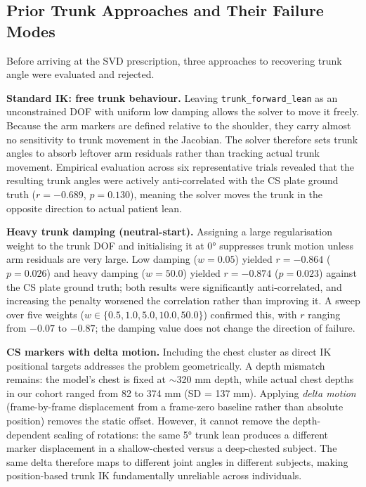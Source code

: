 \documentclass[12pt, a4paper]{elsarticle}
\begin{document}
\subsection{Prior Trunk Approaches and Their Failure Modes}
\label{sec:prior_trunk}
Before arriving at the SVD prescription, three approaches to recovering trunk angle were evaluated and rejected.

\textbf{Standard IK: free trunk behaviour.} Leaving \texttt{trunk\_forward\_lean} as an unconstrained DOF with uniform low damping allows the solver to move it freely. Because the arm markers are defined relative to the shoulder, they carry almost no sensitivity to trunk movement in the Jacobian. The solver therefore sets trunk angles to absorb leftover arm residuals rather than tracking actual trunk movement. Empirical evaluation across six representative trials revealed that the resulting trunk angles were actively anti-correlated with the CS plate ground truth ($r = -0.689$, $p = 0.130$), meaning the solver moves the trunk in the opposite direction to actual patient lean.

\textbf{Heavy trunk damping (neutral-start).} Assigning a large regularisation weight to the trunk DOF and initialising it at 0° suppresses trunk motion unless arm residuals are very large. Low damping ($w = 0.05$) yielded $r = -0.864$ ($p = 0.026$) and heavy damping ($w = 50.0$) yielded $r = -0.874$ ($p = 0.023$) against the CS plate ground truth; both results were significantly anti-correlated, and increasing the penalty worsened the correlation rather than improving it. A sweep over five weights ($w \in \{0.5, 1.0, 5.0, 10.0, 50.0\}$) confirmed this, with $r$ ranging from $-0.07$ to $-0.87$; the damping value does not change the direction of failure.

\textbf{CS markers with delta motion.} Including the chest cluster as direct IK positional targets addresses the problem geometrically. A depth mismatch remains: the model's chest is fixed at $\sim$320 mm depth, while actual chest depths in our cohort ranged from 82 to 374 mm (SD = 137 mm). Applying \textit{delta motion} (frame-by-frame displacement from a frame-zero baseline rather than absolute position) removes the static offset. However, it cannot remove the depth-dependent scaling of rotations: the same 5° trunk lean produces a different marker displacement in a shallow-chested versus a deep-chested subject. The same delta therefore maps to different joint angles in different subjects, making position-based trunk IK fundamentally unreliable across individuals.
\end{document}
